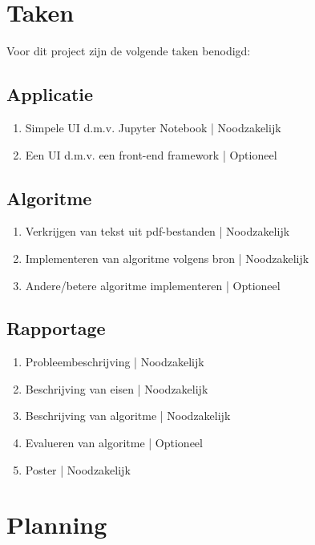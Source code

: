 \documentclass{article}
\begin{document}
\section{Taken}

Voor dit project zijn de volgende taken benodigd:

\subsection{Applicatie}

\begin{enumerate}
  \item Simpele UI d.m.v. Jupyter Notebook | Noodzakelijk
  \item Een UI d.m.v. een front-end framework | Optioneel
\end{enumerate}

\subsection{Algoritme}

\begin{enumerate}
  \item Verkrijgen van tekst uit pdf-bestanden | Noodzakelijk
  \item Implementeren van algoritme volgens bron | Noodzakelijk
  \item Andere/betere algoritme implementeren | Optioneel
\end{enumerate}

\subsection{Rapportage}

\begin{enumerate}
  \item Probleembeschrijving | Noodzakelijk
  \item Beschrijving van eisen | Noodzakelijk
  \item Beschrijving van algoritme | Noodzakelijk
  \item Evalueren van algoritme | Optioneel
  \item Poster | Noodzakelijk
\end{enumerate}

\section{Planning}
\end{document}
